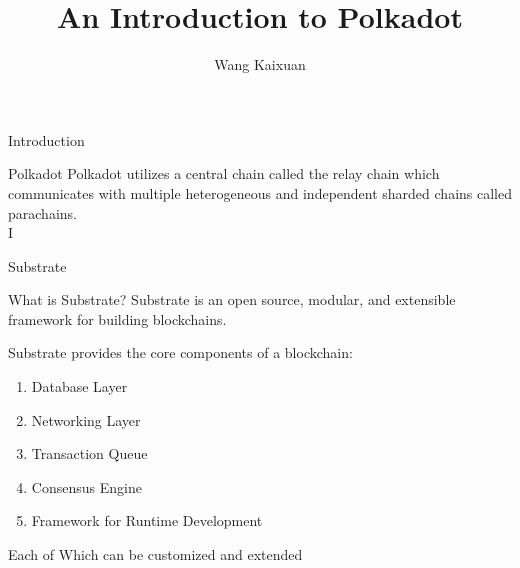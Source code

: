 \documentclass[UTF8]{beamer}
\title{An Introduction to Polkadot}
\author{Wang Kaixuan}
\institute[SJTU]{Shanghai Jiao Tong University}
\begin{document}
	\begin{frame}
		\titlepage
	\end{frame}

	\begin{frame}{Introduction}
		\begin{block}{Polkadot}
			Polkadot utilizes a central chain called the relay chain which communicates with multiple heterogeneous and independent sharded chains called parachains.\\
			I
		\end{block}
	\end{frame}

	\begin{frame}{Substrate}
		\begin{block}{What is Substrate?}
			Substrate is an open source, modular, and extensible framework for building  blockchains.
		\end{block}
		\begin{block}{}
			Substrate provides the core components of a blockchain: 
			\begin{enumerate}
				\item Database Layer
				\item Networking Layer
				\item Transaction Queue
				\item Consensus Engine
				\item Framework for Runtime Development
			\end{enumerate}
		Each of Which can be customized and extended
		\end{block}
	\end{frame}
\end{document}
